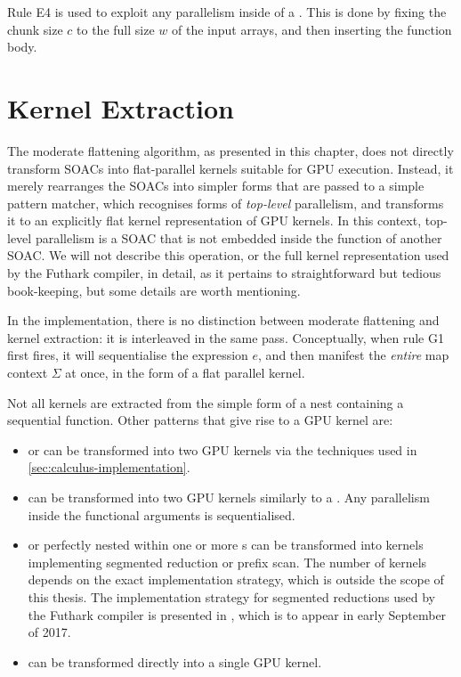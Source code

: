 Rule E4 is used to exploit any parallelism inside of a \StreamSeq{}.
This is done by fixing the chunk size $c$ to the full size $w$ of the
input arrays, and then inserting the function body.

\section{Kernel Extraction}

The moderate flattening algorithm, as presented in this chapter, does
not directly transform SOACs into flat-parallel kernels suitable for
GPU execution.  Instead, it merely rearranges the SOACs into simpler
forms that are passed to a simple pattern matcher, which recognises
forms of \textit{top-level} parallelism, and transforms it to an
explicitly flat kernel representation of GPU kernels.  In this
context, top-level parallelism is a SOAC that is not embedded inside
the function of another SOAC.  We will not describe this operation, or
the full kernel representation used by the Futhark compiler, in
detail, as it pertains to straightforward but tedious book-keeping,
but some details are worth mentioning.

In the implementation, there is no distinction between moderate
flattening and kernel extraction: it is interleaved in the same pass.
Conceptually, when rule G1 first fires, it will sequentialise the
expression $e$, and then manifest the \textit{entire} map context
$\Sigma$ at once, in the form of a flat parallel kernel.

Not all kernels are extracted from the simple form of a  nest
containing a sequential function.  Other patterns that give rise to a
GPU kernel are:

\begin{itemize}
\item {} or  can be transformed into two GPU
  kernels via the techniques used in
  \cref{sec:calculus-implementation}.
\item \StreamPar{} can be transformed into two GPU kernels similarly
  to a .  Any parallelism inside the functional arguments
  is sequentialised.
\item {} or  perfectly nested within one or
  more s can be transformed into kernels implementing
  segmented reduction or prefix scan.  The number of kernels depends
  on the exact implementation strategy, which is outside the scope of
  this thesis.  The implementation strategy for segmented reductions
  used by the Futhark compiler is presented in
  \cite{Futhark:segredomap}, which is to appear in early September of
  2017.
\item {} can be transformed directly into a single GPU
  kernel.
\end{itemize}

